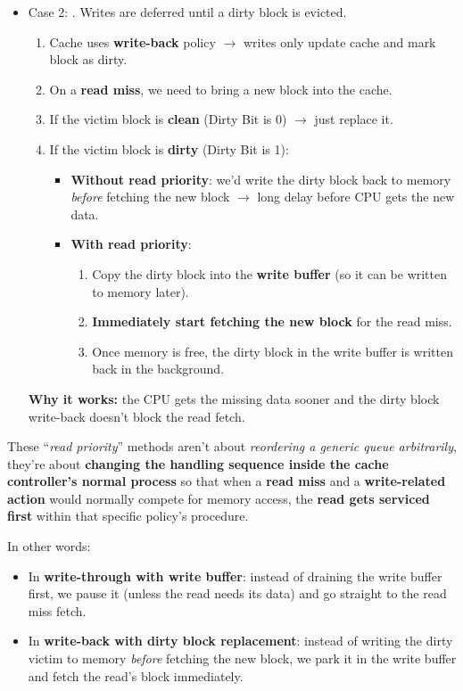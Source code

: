\begin{itemize}
    \item Case 2: . Writes are deferred until a dirty block is evicted.
    \begin{enumerate}
        \item Cache uses \textbf{write-back} policy $\rightarrow$ writes only update cache and mark block as dirty.
        \item On a \textbf{read miss}, we need to bring a new block into the cache.
        \item If the victim block is \textbf{clean} (Dirty Bit is 0) $\rightarrow$ just replace it.
        \item If the victim block is \textbf{dirty} (Dirty Bit is 1):
        \begin{itemize}
            \item[\textcolor{Red2}{\faIcon{times}}] \textbf{Without read priority}: we'd write the dirty block back to memory \emph{before} fetching the new block $\rightarrow$ long delay before CPU gets the new data.
            \item[\textcolor{Green3}{\faIcon{check}}] \textbf{With read priority}:
            \begin{enumerate}
                \item Copy the dirty block into the \textbf{write buffer} (so it can be written to memory later).
                \item \textbf{Immediately start fetching the new block} for the read miss.
                \item Once memory is free, the dirty block in the write buffer is written back in the background.
            \end{enumerate}
        \end{itemize}
    \end{enumerate}
    \textcolor{Green3}{ \textbf{Why it works:}} the CPU gets the missing data sooner and the dirty block write-back doesn't block the read fetch.
\end{itemize}
These ``\emph{read priority}'' methods aren't about \emph{reordering a generic queue arbitrarily}, they're about \textbf{changing the handling sequence inside the cache controller's normal process} so that when a \textbf{read miss} and a \textbf{write-related action} would normally compete for memory access, the \textbf{read gets serviced first} within that specific policy's procedure.

\highspace
In other words:
\begin{itemize}
    \item In \textbf{write-through with write buffer}: instead of draining the write buffer first, we pause it (unless the read needs its data) and go straight to the read miss fetch.
    \item In \textbf{write-back with dirty block replacement}: instead of writing the dirty victim to memory \emph{before} fetching the new block, we park it in the write buffer and fetch the read's block immediately.
\end{itemize}

